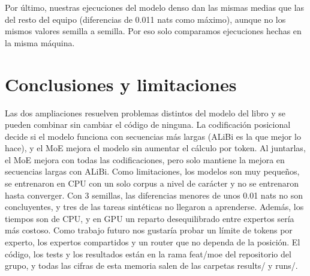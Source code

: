 \documentclass[11pt]{article}
\begin{document}
Por último, nuestras ejecuciones del modelo denso dan las mismas medias que las del resto del equipo (diferencias de 0.011 nats como máximo), aunque no los mismos valores semilla a semilla. Por eso solo comparamos ejecuciones hechas en la misma máquina.

\section{Conclusiones y limitaciones}
Las dos ampliaciones resuelven problemas distintos del modelo del libro y se pueden combinar sin cambiar el código de ninguna.
La codificación posicional decide si el modelo funciona con secuencias más largas (ALiBi es la que mejor lo hace), y el MoE mejora el modelo sin aumentar el cálculo por token.
Al juntarlas, el MoE mejora con todas las codificaciones, pero solo mantiene la mejora en secuencias largas con ALiBi.
Como limitaciones, los modelos son muy pequeños, se entrenaron en CPU con un solo corpus a nivel de carácter y no se entrenaron hasta converger.
Con 3 semillas, las diferencias menores de unos 0.01 nats no son concluyentes, y tres de las tareas sintéticas no llegaron a aprenderse.
Además, los tiempos son de CPU, y en GPU un reparto desequilibrado entre expertos sería más costoso.
Como trabajo futuro nos gustaría probar un límite de tokens por experto, los expertos compartidos \citep{dai2024deepseekmoe} y un router que no dependa de la posición.
El código, los tests y los resultados están en la rama feat/moe del repositorio del grupo, y todas las cifras de esta memoria salen de las carpetas results/ y runs/.


\end{document}
